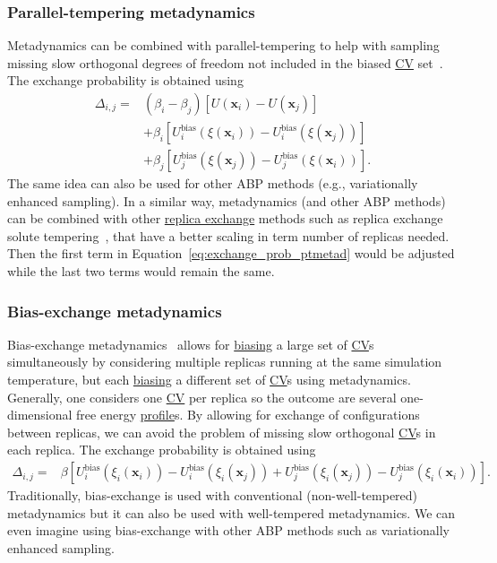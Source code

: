 \documentclass[9pt,review]{livecoms}
\newcommand{\vx}{\mathbf{x}}
\begin{document}
\subsubsection{Parallel-tempering metadynamics}
Metadynamics can be combined with parallel-tempering to help with sampling missing slow orthogonal degrees of freedom not included in the biased \hyperlink{ref:CV} {CV} set~\cite{Bussi-JACS-2006}. The exchange probability is obtained using
\begin{align}
\label{eq:exchange_prob_ptmetad}
\Delta_{i,j} = &
\left(\beta_{i} - \beta_{j}\right)
\left[U(\vx_{i}) - U(\vx_{j})\right]
\nonumber \\ & +
\beta_{i} \left[
U^{\mathrm{bias}}_{i}(\xi(\vx_{i})) - U^{\mathrm{bias}}_{i}(\xi(\vx_{j}))
\right]
\nonumber \\ & +
\beta_{j} \left[
U^{\mathrm{bias}}_{j}(\xi(\vx_{j})) - U^{\mathrm{bias}}_{j}(\xi(\vx_{i}))
\right].
\end{align}
The same idea can also be used for other ABP methods (e.g., variationally enhanced sampling). In a similar way, metadynamics (and other ABP methods) can be combined with other \hyperlink{ref:ReplEx} {replica exchange} methods such as replica exchange solute tempering~\cite{REST2_Wang_2011,HREX_Bussi_2013}, that have a better scaling in term number of replicas needed. Then the first term in Equation~\ref{eq:exchange_prob_ptmetad} would be adjusted while the last two terms would remain the same.

\subsubsection{Bias-exchange metadynamics}
\label{sec:be-metad}
Bias-exchange metadynamics~\cite{Piana2007_bemeta} allows for \hyperlink{ref:biasingE} {biasing} a large set of \hyperlink{ref:CV} {CV}s simultaneously by considering multiple replicas running at the same simulation temperature, but each \hyperlink{ref:biasingE} {biasing} a different set of \hyperlink{ref:CV} {CV}s using metadynamics. Generally, one considers one \hyperlink{ref:CV} {CV} per replica so the outcome are several one-dimensional free energy \hyperlink{ref:FES} {profile}s. By allowing for exchange of configurations between replicas, we can avoid the problem of missing slow orthogonal \hyperlink{ref:CV} {CV}s in each replica.
The exchange probability is obtained using
\begin{align}
\Delta_{i,j} = &
\beta \left[
U^{\mathrm{bias}}_{i}(\xi_{i}(\vx_{i})) - U^{\mathrm{bias}}_{i}(\xi_{i}(\vx_{j})) +
U^{\mathrm{bias}}_{j}(\xi_{i}(\vx_{j})) - U^{\mathrm{bias}}_{j}(\xi_{i}(\vx_{i}))
\right].
\end{align}
Traditionally, bias-exchange is used with conventional (non-well-tempered) metadynamics but it can also be used with well-tempered metadynamics. We can even imagine using bias-exchange with other ABP methods such as variationally enhanced sampling.
%
\end{document}
